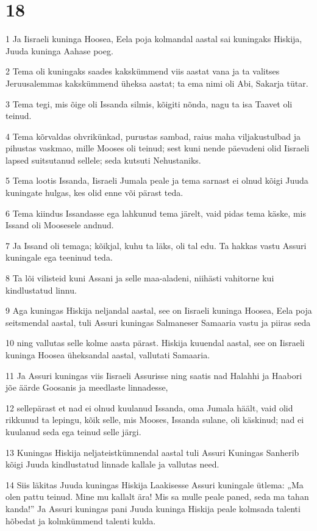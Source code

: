\chapter{18}

\par 1 Ja Iisraeli kuninga Hoosea, Eela poja kolmandal aastal sai kuningaks Hiskija, Juuda kuninga Aahase poeg.
\par 2 Tema oli kuningaks saades kakskümmend viis aastat vana ja ta valitses Jeruusalemmas kakskümmend üheksa aastat; ta ema nimi oli Abi, Sakarja tütar.
\par 3 Tema tegi, mis õige oli Issanda silmis, kõigiti nõnda, nagu ta isa Taavet oli teinud.
\par 4 Tema kõrvaldas ohvrikünkad, purustas sambad, raius maha viljakustulbad ja pihustas vaskmao, mille Mooses oli teinud; sest kuni nende päevadeni olid Iisraeli lapsed suitsutanud sellele; seda kutsuti Nehustaniks.
\par 5 Tema lootis Issanda, Iisraeli Jumala peale ja tema sarnast ei olnud kõigi Juuda kuningate hulgas, kes olid enne või pärast teda.
\par 6 Tema kiindus Issandasse ega lahkunud tema järelt, vaid pidas tema käske, mis Issand oli Moosesele andnud.
\par 7 Ja Issand oli temaga; kõikjal, kuhu ta läks, oli tal edu. Ta hakkas vastu Assuri kuningale ega teeninud teda.
\par 8 Ta lõi vilisteid kuni Assani ja selle maa-aladeni, niihästi vahitorne kui kindlustatud linnu.
\par 9 Aga kuningas Hiskija neljandal aastal, see on Iisraeli kuninga Hoosea, Eela poja seitsmendal aastal, tuli Assuri kuningas Salmaneser Samaaria vastu ja piiras seda
\par 10 ning vallutas selle kolme aasta pärast. Hiskija kuuendal aastal, see on Iisraeli kuninga Hoosea üheksandal aastal, vallutati Samaaria.
\par 11 Ja Assuri kuningas viis Iisraeli Assurisse ning saatis nad Halahhi ja Haabori jõe äärde Goosanis ja meedlaste linnadesse,
\par 12 sellepärast et nad ei olnud kuulanud Issanda, oma Jumala häält, vaid olid rikkunud ta lepingu, kõik selle, mis Mooses, Issanda sulane, oli käskinud; nad ei kuulanud seda ega teinud selle järgi.
\par 13 Kuningas Hiskija neljateistkümnendal aastal tuli Assuri Kuningas Sanherib kõigi Juuda kindlustatud linnade kallale ja vallutas need.
\par 14 Siis läkitas Juuda kuningas Hiskija Laakisesse Assuri kuningale ütlema: „Ma olen pattu teinud. Mine mu kallalt ära! Mis sa mulle peale paned, seda ma tahan kanda!” Ja Assuri kuningas pani Juuda kuninga Hiskija peale kolmsada talenti hõbedat ja kolmkümmend talenti kulda.
